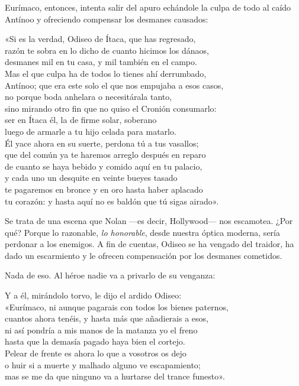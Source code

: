 Eurímaco, entonces, intenta salir del apuro echándole la culpa de todo al caído Antínoo y ofreciendo compensar los desmanes causados:

\begin{versocita}
«Si es la verdad, Odiseo de Ítaca, que has regresado,\\
razón te sobra en lo dicho de cuanto hicimos los dánaos,\\
desmanes mil en tu casa, y mil también en el campo.\\
Mas el que culpa ha de todos lo tienes ahí derrumbado,\\
Antínoo; que era este solo el que nos empujaba a esos casos,\\
no porque boda anhelara o necesitárala tanto,\\
sino mirando otro fin que no quiso el Cronión consumarlo:\\
ser en Ítaca él, la de firme solar, soberano\\
luego de armarle a tu hijo celada para matarlo.\\
Él yace ahora en su suerte, perdona tú a tus vasallos;\\
que del común ya te haremos arreglo después en reparo\\
de cuanto se haya bebido y comido aquí en tu palacio,\\
y cada uno un desquite en veinte bueyes tasado\\
te pagaremos en bronce y en oro hasta haber aplacado\\
tu corazón: y hasta aquí no es baldón que tú sigas airado».
\end{versocita}

Se trata de una escena que Nolan ---es decir, Hollywood--- nos escamotea. ¿Por qué? Porque lo razonable, \emph{lo honorable}, desde nuestra óptica moderna, sería perdonar a los enemigos. A fin de cuentas, Odiseo se ha vengado del traidor, ha dado un escarmiento y le ofrecen compensación por los desmanes cometidos.

Nada de eso. Al héroe nadie va a privarlo de su venganza:

\begin{versocita}
Y a él, mirándolo torvo, le dijo el ardido Odiseo:\\
«Eurímaco, ni aunque pagarais con todos los bienes paternos,\\
cuantos ahora tenéis, y hasta más que añadierais a esos,\\
ni así pondría a mis manos de la matanza yo el freno\\
hasta que la demasía pagado haya bien el cortejo.\\
Pelear de frente es ahora lo que a vosotros os dejo\\
o huir si a muerte y malhado alguno ve escapamiento;\\
mas se me da que ninguno va a hurtarse del trance funesto».
\end{versocita}

